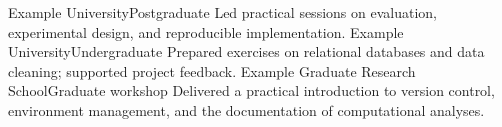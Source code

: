   {Example University}{Postgraduate}{
  Led practical sessions on evaluation, experimental design, and reproducible implementation.
}
  {Example University}{Undergraduate}{
  Prepared exercises on relational databases and data cleaning; supported project feedback.
}
  {Example Graduate Research School}{Graduate workshop}{
  Delivered a practical introduction to version control, environment management,
  and the documentation of computational analyses.
}
